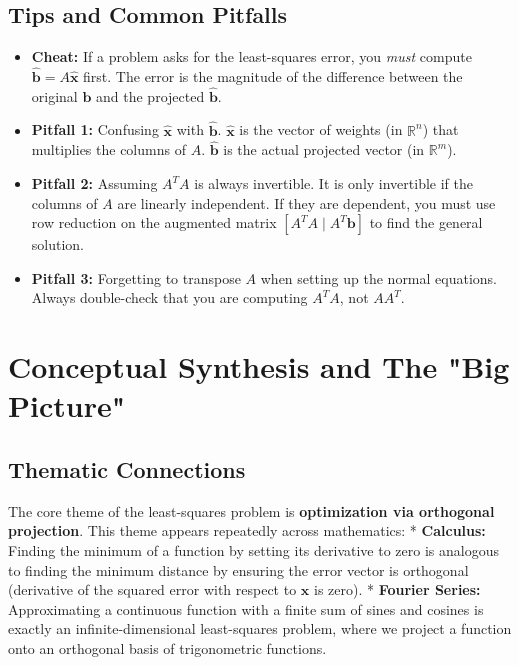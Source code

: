 \documentclass[11pt, letterpaper]{article}
\theoremstyle{definition}
\theoremstyle{remark}
\newcommand{\R}{\mathbb{R}}
\begin{document}
\subsection{Tips and Common Pitfalls}
\begin{itemize}
    \item \textbf{Cheat:} If a problem asks for the least-squares error, you \textit{must} compute $\hat{\mathbf{b}} = A\hat{\mathbf{x}}$ first. The error is the magnitude of the difference between the original $\mathbf{b}$ and the projected $\hat{\mathbf{b}}$.
    \item \textbf{Pitfall 1:} Confusing $\hat{\mathbf{x}}$ with $\hat{\mathbf{b}}$. $\hat{\mathbf{x}}$ is the vector of weights (in $\R^n$) that multiplies the columns of $A$. $\hat{\mathbf{b}}$ is the actual projected vector (in $\R^m$).
    \item \textbf{Pitfall 2:} Assuming $A^T A$ is always invertible. It is only invertible if the columns of $A$ are linearly independent. If they are dependent, you must use row reduction on the augmented matrix $[A^T A \mid A^T \mathbf{b}]$ to find the general solution.
    \item \textbf{Pitfall 3:} Forgetting to transpose $A$ when setting up the normal equations. Always double-check that you are computing $A^T A$, not $A A^T$.
\end{itemize}

\newpage
\section{Conceptual Synthesis and The "Big Picture"}

\subsection{Thematic Connections}
The core theme of the least-squares problem is \textbf{optimization via orthogonal projection}. This theme appears repeatedly across mathematics:
*   \textbf{Calculus:} Finding the minimum of a function by setting its derivative to zero is analogous to finding the minimum distance by ensuring the error vector is orthogonal (derivative of the squared error with respect to $\mathbf{x}$ is zero).
*   \textbf{Fourier Series:} Approximating a continuous function with a finite sum of sines and cosines is exactly an infinite-dimensional least-squares problem, where we project a function onto an orthogonal basis of trigonometric functions.
\end{document}

